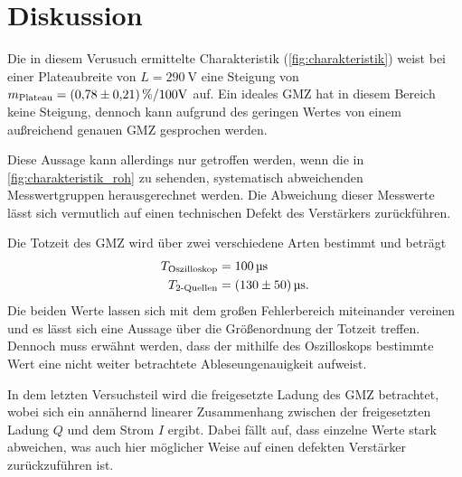 \section{Diskussion}
\label{sec:Diskussion}
Die in diesem Verusuch ermittelte Charakteristik (\autoref{fig:charakteristik}) weist bei einer Plateaubreite
von $L=\qty{290}{\volt}$ eine Steigung von $m_{\text{Plateau}} = \qty{0.78+-0.21}{\percent\per100\volt}$
auf. Ein ideales GMZ hat in diesem Bereich keine Steigung, dennoch kann aufgrund des geringen Wertes von einem außreichend
genauen GMZ gesprochen werden.

Diese Aussage kann allerdings nur getroffen werden, wenn die in \autoref{fig:charakteristik_roh} zu sehenden, systematisch 
abweichenden Messwertgruppen herausgerechnet werden. Die Abweichung dieser Messwerte lässt sich vermutlich auf einen
technischen Defekt des Verstärkers zurückführen.

Die Totzeit des GMZ wird über zwei verschiedene Arten bestimmt und beträgt
\begin{align*}
    T_{\text{Oszilloskop}} &= \qty{100}{\micro\second} \\
    T_{\text{2-Quellen}} &= \qty{130+-50}{\micro\second}.
\end{align*}
Die beiden Werte lassen sich mit dem großen Fehlerbereich miteinander vereinen und es lässt sich eine Aussage 
über die Größenordnung der Totzeit treffen. Dennoch muss erwähnt werden, dass der mithilfe des Oszilloskops bestimmte Wert
eine nicht weiter betrachtete Ableseungenauigkeit aufweist.

In dem letzten Versuchsteil wird die freigesetzte Ladung des GMZ betrachtet, wobei sich ein annähernd linearer Zusammenhang
zwischen der freigesetzten Ladung $Q$ und dem Strom $I$ ergibt. Dabei fällt auf, dass einzelne Werte stark abweichen, was auch
hier möglicher Weise auf einen defekten Verstärker zurückzuführen ist.